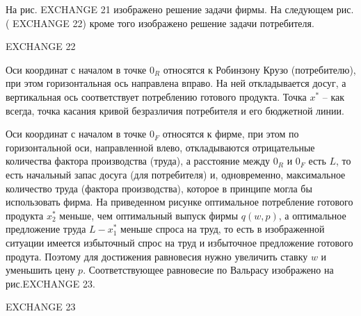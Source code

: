 На рис. EXCHANGE 21 изображено решение задачи фирмы. На следующем
рис. ( EXCHANGE 22) кроме того изображено решение задачи
потребителя.

EXCHANGE 22

Оси координат с началом в точке $0_R$ относятся к Робинзону Крузо
(потребителю), при этом горизонтальная ось направлена вправо. На ней
откладывается досуг, а вертикальная ось соответствует потреблению
готового продукта. Точка $x^*$ -- как всегда, точка касания кривой
безразличия потребителя и его бюджетной линии.

Оси координат с началом в точке $0_F$ относятся к фирме, при этом по
горизонтальной оси, направленной влево, откладываются отрицательные
количества фактора производства (труда), а расстояние между $0_R$ и
$0_F$ есть $L$, то есть начальный запас досуга (для потребителя) и,
одновременно, максимальное количество труда (фактора производства),
которое в принципе могла бы использовать фирма. На приведенном
рисунке оптимальное потребление готового продукта $x^*_2$ меньше,
чем оптимальный выпуск фирмы $q(w,p)$, а оптимальное предложение
труда $L-x^*_1$ меньше спроса на труд, то есть в изображенной
ситуации имеется избыточный спрос на труд и избыточное предложение
готового продута. Поэтому для достижения равновесия нужно увеличить
ставку $w$ и уменьшить цену $p$. Соответствующее равновесие по
Вальрасу изображено на рис.EXCHANGE 23.

EXCHANGE 23
